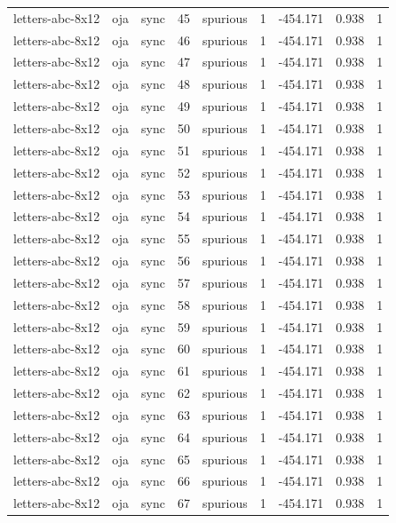 \begin{tabular}{lllrlrrrr}
letters-abc-8x12 & oja & sync & 45 & spurious & 1 & -454.171 & 0.938 & 1 \\
letters-abc-8x12 & oja & sync & 46 & spurious & 1 & -454.171 & 0.938 & 1 \\
letters-abc-8x12 & oja & sync & 47 & spurious & 1 & -454.171 & 0.938 & 1 \\
letters-abc-8x12 & oja & sync & 48 & spurious & 1 & -454.171 & 0.938 & 1 \\
letters-abc-8x12 & oja & sync & 49 & spurious & 1 & -454.171 & 0.938 & 1 \\
letters-abc-8x12 & oja & sync & 50 & spurious & 1 & -454.171 & 0.938 & 1 \\
letters-abc-8x12 & oja & sync & 51 & spurious & 1 & -454.171 & 0.938 & 1 \\
letters-abc-8x12 & oja & sync & 52 & spurious & 1 & -454.171 & 0.938 & 1 \\
letters-abc-8x12 & oja & sync & 53 & spurious & 1 & -454.171 & 0.938 & 1 \\
letters-abc-8x12 & oja & sync & 54 & spurious & 1 & -454.171 & 0.938 & 1 \\
letters-abc-8x12 & oja & sync & 55 & spurious & 1 & -454.171 & 0.938 & 1 \\
letters-abc-8x12 & oja & sync & 56 & spurious & 1 & -454.171 & 0.938 & 1 \\
letters-abc-8x12 & oja & sync & 57 & spurious & 1 & -454.171 & 0.938 & 1 \\
letters-abc-8x12 & oja & sync & 58 & spurious & 1 & -454.171 & 0.938 & 1 \\
letters-abc-8x12 & oja & sync & 59 & spurious & 1 & -454.171 & 0.938 & 1 \\
letters-abc-8x12 & oja & sync & 60 & spurious & 1 & -454.171 & 0.938 & 1 \\
letters-abc-8x12 & oja & sync & 61 & spurious & 1 & -454.171 & 0.938 & 1 \\
letters-abc-8x12 & oja & sync & 62 & spurious & 1 & -454.171 & 0.938 & 1 \\
letters-abc-8x12 & oja & sync & 63 & spurious & 1 & -454.171 & 0.938 & 1 \\
letters-abc-8x12 & oja & sync & 64 & spurious & 1 & -454.171 & 0.938 & 1 \\
letters-abc-8x12 & oja & sync & 65 & spurious & 1 & -454.171 & 0.938 & 1 \\
letters-abc-8x12 & oja & sync & 66 & spurious & 1 & -454.171 & 0.938 & 1 \\
letters-abc-8x12 & oja & sync & 67 & spurious & 1 & -454.171 & 0.938 & 1 \\

\end{tabular}
